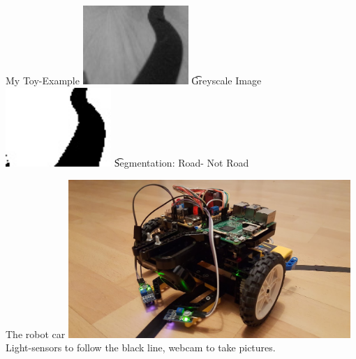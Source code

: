 \begin{frame}{My Toy-Example}
\includegraphics[height=3.0cm]{data/greyimage.jpg} \t Greyscale Image\\ 
\includegraphics[height=3.0cm]{data/segmentation.jpg} \t Segmentation: Road- Not Road\\ 
\end{frame}

\begin{frame}{The robot car}
\includegraphics[height=6.0cm]{data/robot.jpg}\\ 
Light-sensors to follow the black line, webcam to take pictures.
\end{frame}

